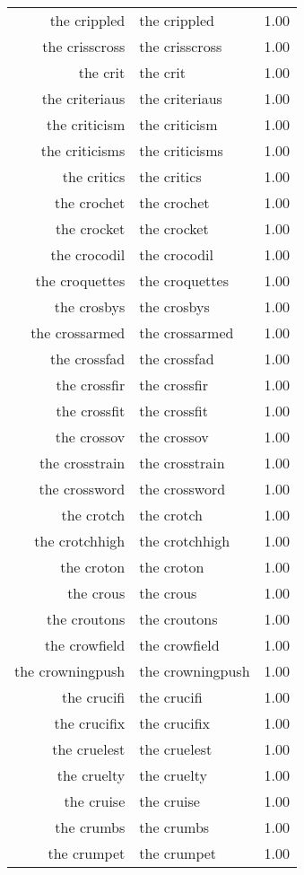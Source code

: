 \begin{table}[ht]
\begin{tabular}{rlr}
  the crippled & the crippled & 1.00 \\ 
  the crisscross & the crisscross & 1.00 \\ 
  the crit & the crit & 1.00 \\ 
  the criteriaus & the criteriaus & 1.00 \\ 
  the criticism & the criticism & 1.00 \\ 
  the criticisms & the criticisms & 1.00 \\ 
  the critics & the critics & 1.00 \\ 
  the crochet & the crochet & 1.00 \\ 
  the crocket & the crocket & 1.00 \\ 
  the crocodil & the crocodil & 1.00 \\ 
  the croquettes & the croquettes & 1.00 \\ 
  the crosbys & the crosbys & 1.00 \\ 
  the crossarmed & the crossarmed & 1.00 \\ 
  the crossfad & the crossfad & 1.00 \\ 
  the crossfir & the crossfir & 1.00 \\ 
  the crossfit & the crossfit & 1.00 \\ 
  the crossov & the crossov & 1.00 \\ 
  the crosstrain & the crosstrain & 1.00 \\ 
  the crossword & the crossword & 1.00 \\ 
  the crotch & the crotch & 1.00 \\ 
  the crotchhigh & the crotchhigh & 1.00 \\ 
  the croton & the croton & 1.00 \\ 
  the crous & the crous & 1.00 \\ 
  the croutons & the croutons & 1.00 \\ 
  the crowfield & the crowfield & 1.00 \\ 
  the crowningpush & the crowningpush & 1.00 \\ 
  the crucifi & the crucifi & 1.00 \\ 
  the crucifix & the crucifix & 1.00 \\ 
  the cruelest & the cruelest & 1.00 \\ 
  the cruelty & the cruelty & 1.00 \\ 
  the cruise & the cruise & 1.00 \\ 
  the crumbs & the crumbs & 1.00 \\ 
  the crumpet & the crumpet & 1.00 \\ 

\end{tabular}
\end{table}
